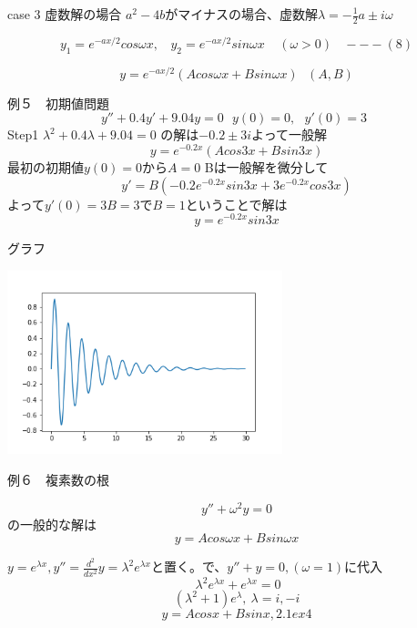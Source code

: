 \documentclass[uplatex]{jsarticle}
\begin{document}
\LARGE case 3 虚数解の場合
 \large
 $a^2-4b$がマイナスの場合、虚数解${\lambda} = -\frac{1}{2}{a\pm i\omega}$

 $$ y_1= {e}^{-ax/2}cos{\omega x}, \ \ \ \  y_2={e}^{-ax/2}sin{\omega x} \ \ \ \ \  ({\omega} >0) \ \ \ \ ---(8)$$

 $$ y = {e}^{-ax/2}(A{cos {\omega x}} + B{sin{\omega x}}) \ \ \ (A,B) $$

例５　初期値問題
$$y''+0.4y'+9.04y=0 \ \ \ y(0)=0, \ \ \ y'(0)=3 \ \ $$
Step1 $ {\lambda }^2 + 0.4{\lambda} +9.04 =0$ の解は$-0.2\pm 3i$よって一般解
$$ y= {e}^{-0.2x}(A{cos 3x}+B{sin 3x})$$
最初の初期値$y(0)=0$から$A=0$ Bは一般解を微分して
$$ y'=B(-0.2{e}^{-0.2x}{sin 3x}+3{e}^{-0.2x}{cos 3x}) $$
よって$y'(0)=3B=3$で$B=1$ということで解は
$$y={e}^{-0.2x}{sin 3x}$$


グラフ

\includegraphics[width=8cm]{../ipython/imag.png}

例６　複素数の根

$$y''+{\omega }^2y=0$$
の一般的な解は
$$ y = A{cos{\omega x}} + B{sin{\omega x}}$$

$ y = {e}^{\lambda x}, y''= \frac{d^2}{dx^2}y = {\lambda }^2{e}^{\lambda x}$と置く。で、$ y'' +y =0,({\omega} =1)$に代入
$$  \ \lambda^2{e}^{\lambda x} + {e}^{\lambda x}=0$$
$$ ({\lambda}^2 +1){e}^{\lambda}, \  {\lambda }= i, -i $$
$$ y = A{cos x} + B{sin x} , 2.1 ex4 $$
\end{document}
